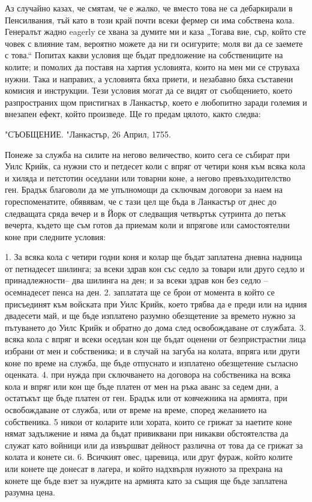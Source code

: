\documentclass[12pt]{book}
\begin{document}
Аз случайно казах, че смятам, че е жалко, че вместо това не са дебаркирали в Пенсилвания, тъй като в този край почти всеки фермер си има собствена кола. Генералът жадно eagerly се хвана за думите ми и каза „Тогава вие, сър, който сте човек с влияние там, вероятно можете да ни ги осигурите; моля ви да се заемете с това.“ Попитах какви условия ще бъдат предложение на собствениците на колите; и помолих да поставя на хартия условията, които на мен ми се струваха нужни. Така и направих, а условията бяха приети, и незабавно бяха съставени комисия и инструкции. Тези условия могат да се видят от съобщението, което разпространих щом пристигнах в Ланкастър, което е любопитно заради големия и внезапен ефект, който произведе. Ще го предам цялото, както следва:

               "СЪОБЩЕНИЕ.
                        "Ланкастър, 26 Април, 1755.

Понеже за служба на силите на негово величество, които сега се събират при Уилс Крийк, са нужни сто и петдесет коли с впряг от четири коня към всяка кола и хиляда и петстотин оседлани или товарни коне, а негово превъзходителство ген. Брадък благоволи да ме упълномощи да сключвам договори за наем на гореспоменатите, обявявам, че с тази цел ще бъда в Ланкастър от днес до следващата сряда вечер и в Йорк от следващия четвъртък сутринта до петък вечерта, където ще съм готов да приемам коли и впрягове или самостоятелни коне при следните условия:

1. За всяка кола с четири годни коня и колар ще бъдат заплатена дневна надница от петнадесет шилинга; за всеки здрав кон със седло за товари или друго седло и принадлежности– два шилинга на ден; и за всеки здрав кон без седло – осемнадесет пенса на ден. 2. заплатата ще се брои от момента в който се присъединят към войската при Уилс Крийк, което трябва да е преди или на идния двадесети май, и ще бъде изплатено разумно обезщетение за времето нужно за пътуването до Уилс Крийк и обратно до дома след освобождаване от службата. 3. всяка кола с впряг и всеки оседлан кон ще бъдат оценени от безпристрастни лица избрани от мен и собственика; и в случай на загуба на колата, впряга или други коне по време на служба, ще бъде отпуснато и изплатено обезщетение съгласно оценката. 4. при нужда при сключването на договора на собственика на всяка кола и впряг или кон ще бъде платен от мен на ръка аванс за седем дни, а остатъкът ще бъде платен от ген. Брадък или от ковчежника на армията, при освобождаване от служба, или от време на време, според желанието на собственика. 5 никои от коларите или хората, които се грижат за наетите коне нямат задължение и няма да бъдат привиквани при никакви обстоятелства да служат като войници или да извършват дейност различна от това да се грижат за колата и конете си. 6. Всичкият овес, царевица, или друг фураж, който колите или конете ще донесат в лагера, и който надхвърля нужното за прехрана на конете ще бъде взет за нуждите на армията като за същия ще бъде заплатена разумна цена.
\end{document}
